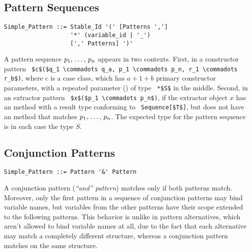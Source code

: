 \subsection{Pattern Sequences}
\label{sec:pattern-sequences}

\syntax\begin{lstlisting}
Simple_Pattern ::= Stable_Id '(' [Patterns ','] 
                   '*' (variable_id | '_')
                   [',' Patterns] ')'
\end{lstlisting}

A pattern sequence $p_1 ,\, \ldots ,\, p_n$ appears in two contexts. First, in a constructor pattern ~\lstinline!$c$($q_1 \commadots q_a, p_1 \commadots p_n, r_1 \commadots r_b$)!, where $c$ is a case class, which has $a+1+b$ primary constructor parameters, with a repeated parameter () of type ~\lstinline!*$S$! in the middle. Second, in an extractor pattern ~\lstinline!$x$($p_1 \commadots p_n$)!, if the extractor object $x$ has an  method with a result type conforming to ~\lstinline!Sequence[$T$]!, but does not have an  method that matches $p_1 ,\, \ldots ,\, p_n$. The expected type for the pattern sequence is in each case the type $S$. 







\subsection{Conjunction Patterns}
\label{sec:conjunction-patterns}

\syntax\begin{lstlisting}
Simple_Pattern ::= Pattern '&' Pattern
\end{lstlisting}

A conjunction pattern ({\em {\normalfont ``and''} pattern}) matches only if both patterns match. Moreover, only the first pattern in a sequence of conjunction patterns may bind variable names, but variables from the other patterns have their scope extended to the following patterns. This behavior is unlike in pattern alternatives, which aren't allowed to bind variable names at all, due to the fact that each alternative may match a completely different structure, whereas a conjunction pattern matches on the same structure. 






